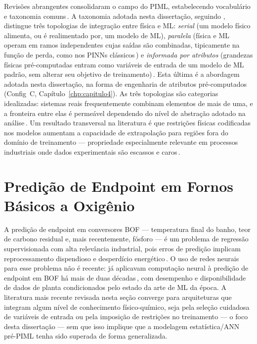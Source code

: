 Revisões abrangentes consolidaram o campo do PIML, estabelecendo vocabulário e taxonomia comuns\,\cite{cuomo2022physics,willard2020integrating,karniadakis2021physics}. A taxonomia adotada nesta dissertação, seguindo \citeauthor{willard2020integrating}, distingue três topologias de integração entre física e ML: \textit{serial} (um modelo físico alimenta, ou é realimentado por, um modelo de ML), \textit{paralela} (física e ML operam em ramos independentes cujas saídas são combinadas, tipicamente na função de perda, como nos PINNs clássicos\,\cite{raissi2019pinns}) e \textit{informada por atributos} (grandezas físicas pré-computadas entram como variáveis de entrada de um modelo de ML padrão, sem alterar seu objetivo de treinamento)\,\cite{willard2020integrating}. Esta última é a abordagem adotada nesta dissertação, na forma de engenharia de atributos pré-computados (Config~C, Capítulo~\ref{chp:capitulo4}). As três topologias são categorias idealizadas: sistemas reais frequentemente combinam elementos de mais de uma, e a fronteira entre elas é permeável dependendo do nível de abstração adotado na análise\,\cite{cuomo2022physics}. Um resultado transversal na literatura é que restrições físicas codificadas nos modelos aumentam a capacidade de extrapolação para regiões fora do domínio de treinamento --- propriedade especialmente relevante em processos industriais onde dados experimentais são escassos e caros\,\cite{willard2020integrating}.

\section{Predição de Endpoint em Fornos Básicos a Oxigênio}
\label{sec:bof-endpoint}

A predição de endpoint em conversores BOF — temperatura final do banho, teor de carbono residual e, mais recentemente, fósforo — é um problema de regressão supervisionada com alta relevância industrial, pois erros de predição implicam reprocessamento dispendioso e desperdício energético\,\cite{chattopadhyay2022hybrid,zhou2024bof}. O uso de redes neurais para esse problema não é recente: \citeauthor{cox2002neural} já aplicavam computação neural à predição de endpoint em BOF há mais de duas décadas\,\cite{cox2002neural}, com desempenho e disponibilidade de dados de planta condicionados pelo estado da arte de ML da época. A literatura mais recente revisada nesta seção converge para arquiteturas que integram algum nível de conhecimento físico-químico, seja pela seleção cuidadosa de variáveis de entrada ou pela imposição de restrições no treinamento — o foco desta dissertação --- sem que isso implique que a modelagem estatística/ANN pré-PIML tenha sido superada de forma generalizada.

